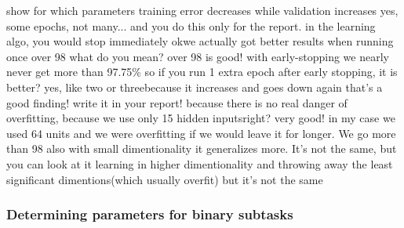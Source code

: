 show for which parameters training error decreases while validation increases
yes, some epochs, not many... and you do this only for the report. in the learning algo, you would stop immediately
okwe actually got better results when running once over 98%
what do you mean? over 98 is good! with early-stopping we nearly never get more than 97.75\% so if you run 1 extra epoch after early stopping, it is better?
yes, like two or threebecause it increases and goes down again that's a good finding!
write it in your report!
because there is no real danger of overfitting, because we use only 15 hidden inputsright?
very good! in my case we used 64 units and we were overfitting if we would leave it for longer. We go more than 98 also
with small dimentionality it generalizes more. It's not the same, but you can look at it learning in higher dimentionality and throwing away the least significant dimentions(which usually overfit)
but it's not the same

\subsubsection{Determining parameters for binary subtasks}

